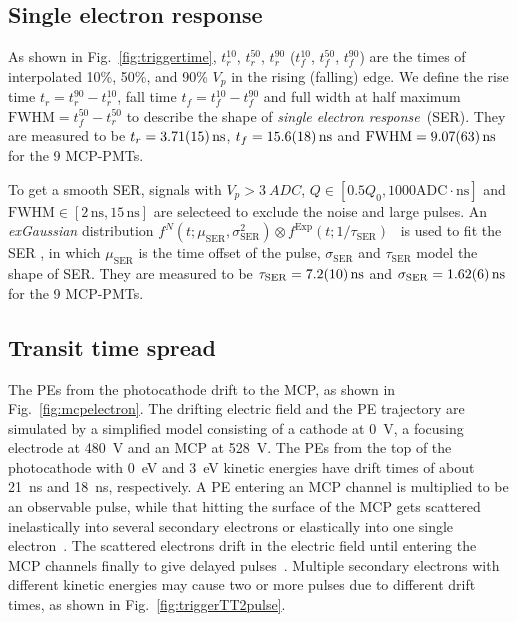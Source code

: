 \subsection{Single electron response}
\label{sec:SER}
As shown in Fig.~\ref{fig:triggertime}, $t^{10}_r$, $t^{50}_r$, $t^{90}_r$ ($t^{10}_f$, $t^{50}_f$, $t^{90}_f$) are the times of interpolated 10\%, 50\%, and 90\% $V_p$ in the rising (falling) edge. We define the rise time $t_r = t^{90}_r - t^{10}_r$, fall time $t_f = t^{10}_f - t^{90}_f$ and full width at half maximum $\mathrm{FWHM} = t^{50}_f - t^{50}_r$ to describe the shape of \emph{single electron response}~(SER).  They are measured to be $t_r = \SI{3.71\pm0.15}{ns}$, $t_f = \SI{15.6\pm1.8}{ns}$ and $\mathrm{FWHM} = \SI{9.07\pm0.63}{ns}$ for the 9 MCP-PMTs.

To get a smooth SER, signals with $V_p>\SI{3}{ADC}$, $Q \in [0.5Q_0, 1000\mathrm{ADC\cdot ns}]$ and $\mathrm{FWHM} \in [2\,\mathrm{ns}, 15\,\mathrm{ns}]$ are selecteed to exclude the noise and large pulses. %
An \emph{exGaussian} distribution $f^N(t;\mu_{\mathrm{SER}},\sigma_\mathrm{SER}^2)\otimes f^{\mathrm{Exp}}(t;1/\tau_\mathrm{SER})$~\cite{Luo:2022xrd} is used to fit the SER%
, in which $\mu_{\mathrm{SER}}$ is the time offset of the pulse, $\sigma_{\mathrm{SER}}$ and $\tau_{\mathrm{SER}}$ model the shape of SER. They are measured to be $\tau_{\mathrm{SER}} = \SI{7.2\pm1.0}{ns}$ and $\sigma_{\mathrm{SER}} = \SI{1.62\pm0.06}{ns}$ for the 9 MCP-PMTs.

\subsection{Transit time spread}
\label{sec:TTS}
The PEs from the photocathode drift to the MCP, as shown in Fig.~\ref{fig:mcpelectron}. The drifting electric field and the PE trajectory are simulated by a simplified model consisting of a cathode at \SI{0}{V}, a focusing electrode at \SI{480}{V} and an MCP at \SI{528}{V}. The PEs from the top of the photocathode with \SI{0}{eV} and \SI{3}{eV} kinetic energies have drift times of about \SI{21}{ns} and \SI{18}{ns}, respectively. A PE entering an MCP channel is multiplied to be an observable pulse, while that hitting the surface of the MCP gets scattered inelastically into several secondary electrons or elastically into one single electron~\cite{Furman}. The scattered electrons drift in the electric field until entering the MCP channels finally to give delayed pulses~\cite{KM3NetTesting}. Multiple secondary electrons with different kinetic energies may cause two or more pulses due to different drift times, as shown in Fig.~\ref{fig:triggerTT2pulse}.

